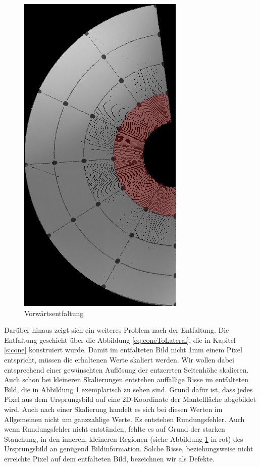 \begin{figure}[!htb]
	\centering
	\includegraphics[angle=-90, width=.7\textwidth]{images/coneRaspUnWarpForwardHigh.png}
	\caption{Vorwärtsentfaltung}
	\label{fig:forwardHoles}
\end{figure}

Darüber hinaus zeigt sich ein weiteres Problem nach der Entfaltung. Die Entfaltung geschieht über die Abbildung \ref{eq:coneToLateral}, die in Kapitel \ref{s:cone} konstruiert wurde. 
Damit im entfalteten Bild nicht 1mm einem Pixel entspricht, müssen die erhaltenen Werte skaliert werden. Wir wollen dabei entsprechend einer gewünschten Auflösung der entzerrten Seitenhöhe skalieren. 
Auch schon bei kleineren Skalierungen entstehen auffällige Risse im entfalteten Bild, die in Abbildung \ref{fig:forwardHoles} exemplarisch zu sehen sind. Grund dafür ist, dass jedes Pixel aus dem Ursprungsbild auf eine 2D-Koordinate der Mantelfläche abgebildet wird. Auch nach einer Skalierung handelt es sich bei diesen Werten im Allgemeinen nicht um ganzzahlige Werte. Es entstehen Rundungsfehler. Auch wenn Rundungsfehler nicht entständen, fehlte es auf Grund der starken Stauchung, in den inneren, kleineren Regionen (siehe Abbildung \ref{fig:forwardHoles} in rot) des Ursprungsbild an genügend Bildinformation. Solche Risse, beziehungsweise nicht erreichte Pixel auf dem entfalteten Bild, bezeichnen wir als Defekte. 

